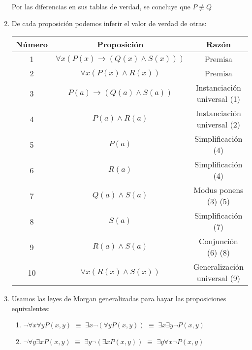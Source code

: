 \documentclass[10pt]{report}
\begin{document}
\begin{enumerate}
        Por las diferencias en sus tablas de verdad, se concluye que $P \not \equiv Q$
        
	\item De cada proposición podemos inferir el valor de verdad de otras:
	
	    \begin{center}
            \begin{tabular}{ |c|c|c| } 
             \hline 
             
             Número & Proposición & Razón\\  [0.5ex] 
                \hline
             1 & $\forall x(P(x)\rightarrow (Q(x) \land S(x) ))$ & Premisa\\ [0.5ex]
             2 & $\forall x(P(x) \land R(x))$  & Premisa\\ [0.5ex]
             3 & $P(a)\rightarrow (Q(a) \land S(a) )$ & Instanciación universal (1)\\ [0.5ex]
             4 & $P(a) \land R(a)$ & Instanciación universal (2)\\ [0.5ex]
             5 & $P(a)$ & Simplificación (4)\\ 
             6 & $R(a)$ & Simplificación (4)\\ 
             7 & $Q(a) \land S(a) $ & Modus ponens (3) (5)\\
             8 & $S(a)$ & Simplificación (7)\\
             9 & $R(a) \land S(a)$ & Conjunción (6) (8)\\
             10 & $\forall x(R(x) \land S(x))$ & Generalización universal (9)\\
             \hline
            \end{tabular}
        \end{center}
	
	\item Usamos las leyes de Morgan generalizadas para hayar las proposiciones equivalentes:
	
	    \begin{enumerate}
	    
	        \item 
	        $\neg \forall x \forall y P(x,y)$ 
                $\equiv$ 
	        $\exists x \neg (\forall y P(x,y))$ 
	            $\equiv$ 
	        $\exists x \exists y \neg P(x,y)$
	        \\
	        
	        \item 
	        $\neg \forall y \exists x P(x,y)$
	            $\equiv$
            $\exists y \neg (\exists x P(x,y))$
                $\equiv$
            $\exists y \forall x \neg P(x,y)$
            \\
            

\end{enumerate}
\end{enumerate}
\end{document}
